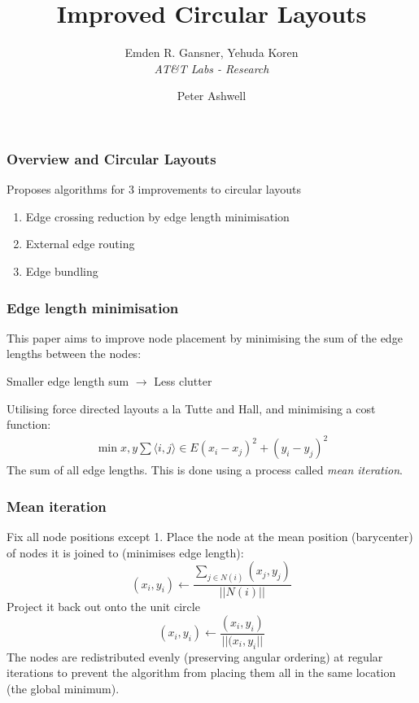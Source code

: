 \documentclass[12pt]{beamer}
\subtitle{Emden R. Gansner, Yehuda Koren \\ \emph{AT\&T Labs - Research}}
\title{Improved Circular Layouts}
\date{}
\author{Peter Ashwell}
\begin{document}
\maketitle

\begin{frame}
	\frametitle{Overview and Circular Layouts}
	\begin{figure}
	  \centering
	\end{figure}
	Proposes algorithms for 3 improvements to circular layouts
	\begin{enumerate}
		\item Edge crossing reduction by edge length minimisation
		\item External edge routing
		\item Edge bundling
	\end{enumerate}

\end{frame}

\begin{frame}
	\frametitle{Edge length minimisation}
	This paper aims to improve node placement by minimising the sum of the edge lengths between the nodes:
	\begin{center}
		Smaller edge length sum $\rightarrow$ Less clutter \\
	\end{center}
	Utilising force directed layouts a la Tutte and Hall, and minimising a cost function:
	\begin{align*}
		\min{x,y}\sum\limits{\langle i,j \rangle \in E}(x_i - x_j)^2 + (y_i - y_j)^2 
	\end{align*}
	The sum of all edge lengths. This is done using a process called \emph{mean iteration}.
\end{frame}

\begin{frame}
	\frametitle{Mean iteration}
	Fix all node positions except 1.
	Place the node at the mean position (barycenter) of nodes it is joined to (minimises edge length):
	\begin{equation}
		(x_i, y_i) \leftarrow \left. \frac{\sum_{j \in N(i)}(x_j,y_j)}{||N(i)||} \right.
	\end{equation}
	Project it back out onto the unit circle
	\begin{equation}
		(x_i, y_i) \leftarrow \left. \frac{(x_i,y_i)}{||(x_i, y_i||} \right.
	\end{equation}
	The nodes are redistributed evenly (preserving angular ordering) at regular iterations to prevent the algorithm from placing them all in the same location (the global minimum).
	
\end{frame}
\end{document}
